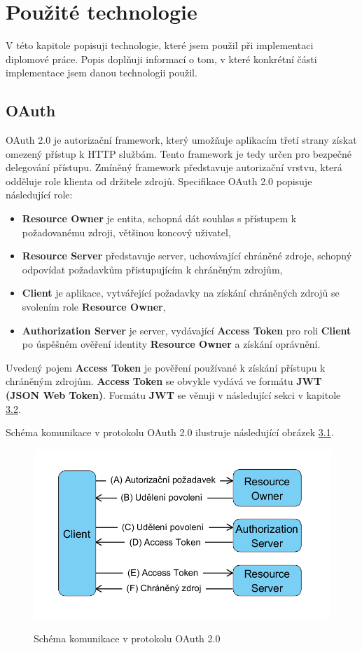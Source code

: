 \documentclass[
  printed, %
  twoside, %
  table,   %
  nolof,     %
  nolot,     %
]{fithesis3}
\begin{document}
\chapter{Použité technologie}
V této kapitole popisuji technologie, které jsem použil při implementaci diplomové práce. Popis doplňuji informací o tom, v které konkrétní části implementace jsem danou technologii použil.
\section{OAuth}
\label{sec:oauth}
OAuth 2.0 \cite{rfc6749} je autorizační framework, který umožňuje aplikacím třetí strany získat omezený přístup k HTTP službám. Tento framework je tedy určen pro bezpečné delegování přístupu. Zmíněný framework představuje autorizační vrstvu, která odděluje role klienta od držitele zdrojů. Specifikace OAuth 2.0 popisuje následující role: 
\begin{itemize}
    \item \textbf{Resource Owner} je entita, schopná dát souhlas s přístupem k požadovanému zdroji, většinou koncový uživatel,
    \item \textbf{Resource Server} představuje server, uchovávající chráněné zdroje, schopný odpovídat požadavkům přistupujícím k chráněným zdrojům,
    \item \textbf{Client} je aplikace, vytvářející požadavky na získání chráněných zdrojů se svolením role \textbf{Resource Owner},
    \item \textbf{Authorization Server} je server, vydávající \textbf{Access Token} pro roli \textbf{Client} po úspěšném ověření identity \textbf{Resource Owner} a získání oprávnění.
\end{itemize}
Uvedený pojem \textbf{Access Token} je pověření používané k získání přístupu k chráněným zdrojům. \textbf{Access Token} se obvykle vydává ve formátu \textbf{JWT (JSON Web Token)}. Formátu \textbf{JWT} se věnuji v následující sekci v kapitole \hyperref[sec:oidc]{3.2}.  \par

Schéma komunikace v protokolu OAuth 2.0 ilustruje následující obrázek \hyperref[fig:oauth]{3.1}. 

\begin{figure}[H]
\caption{Schéma komunikace v protokolu OAuth 2.0}
\centering
\includegraphics[width=12.8cm]{pics/diplomkaOauth} 
\label{fig:oauth}
\end{figure}
\par 
\end{document}

